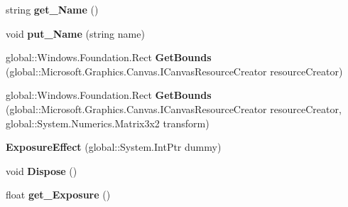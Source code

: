 \begin{DoxyCompactItemize}
\item 
\mbox{\label{class_microsoft_1_1_graphics_1_1_canvas_1_1_effects_1_1_exposure_effect_a371e9d1d4d8a8efd69d8909adcb670eb}} 
string {\bfseries get\+\_\+\+Name} ()
\item 
\mbox{\label{class_microsoft_1_1_graphics_1_1_canvas_1_1_effects_1_1_exposure_effect_a08d222c7d3bda4ff7600028c76094a78}} 
void {\bfseries put\+\_\+\+Name} (string name)
\item 
\mbox{\label{class_microsoft_1_1_graphics_1_1_canvas_1_1_effects_1_1_exposure_effect_a1270050e057b25ed336629d9dbbe3c97}} 
global\+::\+Windows.\+Foundation.\+Rect {\bfseries Get\+Bounds} (global\+::\+Microsoft.\+Graphics.\+Canvas.\+I\+Canvas\+Resource\+Creator resource\+Creator)
\item 
\mbox{\label{class_microsoft_1_1_graphics_1_1_canvas_1_1_effects_1_1_exposure_effect_a0c2998bcc281563540602e5cd9876e4c}} 
global\+::\+Windows.\+Foundation.\+Rect {\bfseries Get\+Bounds} (global\+::\+Microsoft.\+Graphics.\+Canvas.\+I\+Canvas\+Resource\+Creator resource\+Creator, global\+::\+System.\+Numerics.\+Matrix3x2 transform)
\item 
\mbox{\label{class_microsoft_1_1_graphics_1_1_canvas_1_1_effects_1_1_exposure_effect_a71b4e6e4d796061fbe70e8dbafa96676}} 
{\bfseries Exposure\+Effect} (global\+::\+System.\+Int\+Ptr dummy)
\item 
\mbox{\label{class_microsoft_1_1_graphics_1_1_canvas_1_1_effects_1_1_exposure_effect_a073502db74a16a0bc3b88fd3e0feee8a}} 
void {\bfseries Dispose} ()
\item 
\mbox{\label{class_microsoft_1_1_graphics_1_1_canvas_1_1_effects_1_1_exposure_effect_a21127a47d22be5f3657dce651488a984}} 
float {\bfseries get\+\_\+\+Exposure} ()

\end{DoxyCompactItemize}
